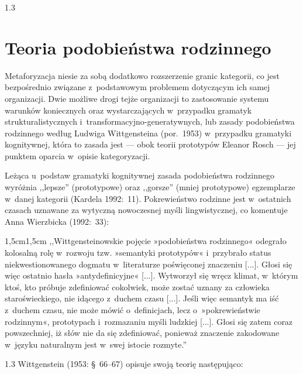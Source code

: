 \documentclass[11pt,a4paper,twoside]{report}
\begin{document}
\begin{spacing}{1.3}
\newpage
\section{Teoria podobieństwa rodzinnego}

Metaforyzacja niesie za sobą dodatkowo rozszerzenie granic kategorii, co jest bezpośrednio związane z~podstawowym problemem dotyczącym ich samej organizacji. Dwie możliwe drogi tejże organizacji to zastosowanie systemu warunków koniecznych oraz wystarczających w~przypadku gramatyk strukturalistycznych i~transforma\-cyjno-generatywnych, lub zasady podobieństwa rodzinnego według Ludwiga Wittgensteina (por.~1953) w~przypadku gramatyki kognitywnej, która to zasada jest --- obok teorii prototypów Eleanor Rosch --- jej punktem oparcia w~opisie kategoryzacji.

Leżąca u~podstaw gramatyki kognitywnej zasada podobieństwa rodzinnego wyróżnia ,,lepsze'' (prototypowe) oraz ,,gorsze'' (mniej prototypowe) egzemplarze w~danej kategorii (Kardela 1992:~11). Pokrewieństwo rodzinne jest w~ostatnich czasach uznawane za wytyczną nowoczesnej myśli lingwistycznej, co komentuje Anna Wierzbicka (1992:~33):
\end{spacing}
\begin{adjustwidth}{1,5cm}{1,5cm}
\small{
,,Wittgensteinowskie pojęcie »podobieństwa rodzinnego« odegrało kolosalną rolę w~rozwoju tzw. »semantyki prototypów« i~przybrało status niekwestionowanego dogmatu w~literaturze poświęconej znaczeniu [...]. Głosi się więc ostatnio hasła »antydefinicyjne« [...]. Wytworzył się wręcz klimat, w~którym ktoś, kto próbuje zdefiniować cokolwiek, może zostać uznany za człowieka staroświeckiego, nie idącego z~duchem czasu [...]. Jeśli więc semantyk ma iść z~duchem czasu, nie może mówić o~definicjach, lecz o~»pokrewieństwie rodzinnym«, prototypach i~rozmazaniu myśli ludzkiej [...]. Głosi się zatem coraz powszechniej, iż słów nie da się zdefiniować, ponieważ znaczenie zakodowane w~języku naturalnym jest w~swej istocie rozmyte.''\\
}
\end{adjustwidth}
\begin{spacing}{1.3}
Wittgenstein (1953: §~66--67) opisuje swoją teorię następująco:
\end{spacing}
\end{document}
